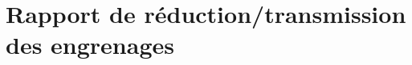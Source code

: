 \def\xxactivite{Cours}
\def\xxauteur{\textsl{Xavier Pessoles}}

\fichetrue
\proftrue
\tdfalse
\coursfalse

\def\xxnumpartie{Rév -- Cin}
\def\xxpartie{Modéliser le comportement cinématique des systèmes mécaniques}
\def\xxnumchapitre{Révision 1 \vspace{.2cm}}
\def\xxchapitre{\hspace{.12cm} Modélisation cinématique }
\def\xxpied{%
Révision cinématique -- Modélisation cinématique\\
Fiche 2 -- \xxactivite%
}


\def\xxcompetences{%
\textsl{%
\textbf{Savoirs et compétences :}\\
}}


\iflivret

\else

\fi
\setlength{\columnseprule}{.1pt}

\vspace{2cm}
\pagestyle{fancy}
\thispagestyle{plain}


\section*{Rapport de réduction/transmission des engrenages}

